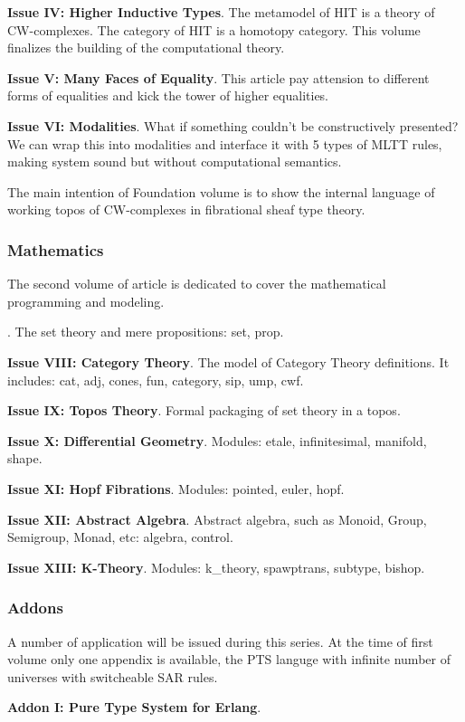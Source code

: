 \documentclass{article}
\theoremstyle{definition}
\begin{document}
{\bf Issue IV: Higher Inductive Types}.
The metamodel of HIT is a theory of CW-complexes. The category of HIT is a homotopy category.
This volume finalizes the building of the computational theory.

{\bf Issue V: Many Faces of Equality}.
This article pay attension to different forms of equalities
and kick the tower of higher equalities.

{\bf Issue VI: Modalities}. What if something couldn't be constructively
presented? We can wrap this into modalities and interface it with 5 types
of MLTT rules, making system sound but without computational semantics.

The main intention of Foundation volume is to show the internal language
of working topos of CW-complexes in fibrational sheaf type theory.

\subsubsection*{Mathematics}

The second volume of article is dedicated to cover the mathematical
programming and modeling.

.
The set theory and mere propositions: set, prop.

{\bf Issue VIII: Category Theory}.
The model of Category Theory definitions. It includes: cat, adj, cones, fun, category, sip, ump, cwf.

{\bf Issue IX: Topos Theory}.
Formal packaging of set theory in a topos.

{\bf Issue X: Differential Geometry}.
Modules: etale, infinitesimal, manifold, shape.

{\bf Issue XI: Hopf Fibrations}.
Modules: pointed, euler, hopf.

{\bf Issue XII: Abstract Algebra}.
Abstract algebra, such as Monoid, Group, Semigroup, Monad, etc: algebra, control.

{\bf Issue XIII: K-Theory}.
Modules: k\_theory, spawptrans, subtype, bishop.

\subsubsection*{Addons}

A number of application will be issued during this series. At the time
of first volume only one appendix is available, the PTS languge with
infinite number of universes with switcheable SAR rules.

{\bf Addon I: Pure Type System for Erlang}.



\end{document}
